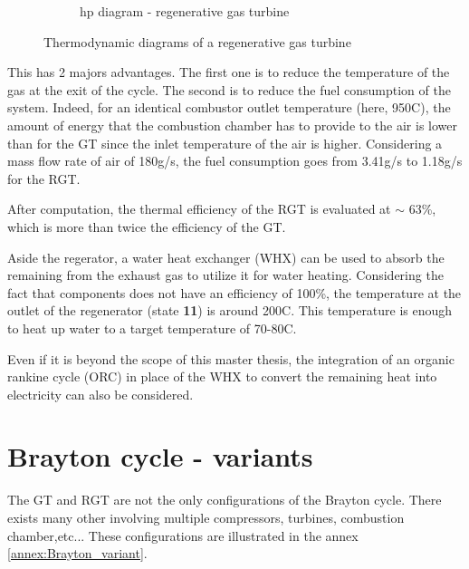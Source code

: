 \begin{figure}[h]
\begin{subfigure}[b]{0.4\textwidth}
         \caption{hp diagram - regenerative gas turbine}
         \label{fig:C4_hp_RGT}
     \end{subfigure}
        \caption{Thermodynamic diagrams of a regenerative gas turbine}
        \label{fig:C4_thermo_diagram_GT}
\end{figure}
\newpage
This has 2 majors advantages. The first one is to reduce the temperature of the gas at the exit of the cycle. The second is to reduce the fuel consumption of the system. Indeed, for an identical combustor outlet temperature (here, 950\degree C), the amount of energy that the combustion chamber has to provide to the air is lower than for the GT since the inlet temperature of the air is higher. Considering a mass flow rate of air of 180g/s, the fuel consumption goes from 3.41g/s to 1.18g/s for the RGT.

After computation, the thermal efficiency of the RGT is evaluated at $\sim$ 63\%, which is more than twice the efficiency of the GT.

Aside the regerator, a water heat exchanger (WHX) can be used to absorb the remaining from the exhaust gas to utilize it for water heating. Considering the fact that components does not have an efficiency of 100\%, the temperature at the outlet of the regenerator (state \textbf{11}) is around 200\degree C. This temperature is enough to heat up water to a target temperature of 70-80\degree C.

Even if it is beyond the scope of this master thesis, the integration of an organic rankine cycle (ORC) in place of the WHX to convert the remaining heat into electricity can also be considered\citep{Quoilin2008}.

\section{Brayton cycle - variants}
The GT and RGT are not the only configurations of the Brayton cycle. There exists many other involving multiple compressors, turbines, combustion chamber,etc... These configurations are illustrated in the annex \ref{annex:Brayton_variant}.
